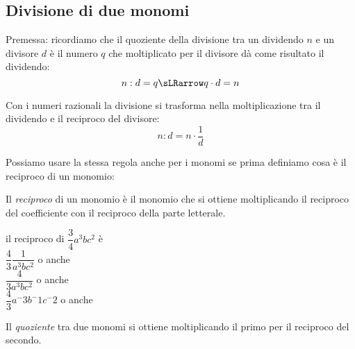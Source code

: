 % 


\subsection{Divisione di due monomi}
\label{subsec:09_monomi_quoziente}

Premessa: ricordiamo che il quoziente della divisione tra un dividendo $n$ 
e un divisore $d$ è il numero $q$ che moltiplicato per il divisore dà come 
risultato il dividendo:
\[n : d = q \sLRarrow q \cdot d = n\]

Con i numeri razionali la divisione si trasforma nella moltiplicazione tra 
il dividendo e il reciproco del divisore:
\[n : d = n \cdot \frac{1}{d}\]

Possiamo usare la stessa regola anche per i monomi se prima definiamo cosa 
è il reciproco di un monomio:

\begin{definizione}
Il \emph{reciproco} di un monomio è il monomio che si ottiene moltiplicando 
il reciproco del coefficiente con il reciproco della parte letterale.
\end{definizione}

\begin{esempio}
 il reciproco di \(\dfrac{3}{4}a^3bc^2\) \quad è\\
\(\dfrac{4}{3}\dfrac{1}{a^3bc^2}\) \quad o anche \\
\(\dfrac{4}{3a^3bc^2}\) \quad o anche \\
\(\dfrac{4}{3}a^-3b^-1c^-2\) \quad o anche \\
\end{esempio}

\begin{definizione}
Il \emph{quoziente} tra due monomi si ottiene moltiplicando il primo per il 
reciproco del secondo.
\end{definizione}

